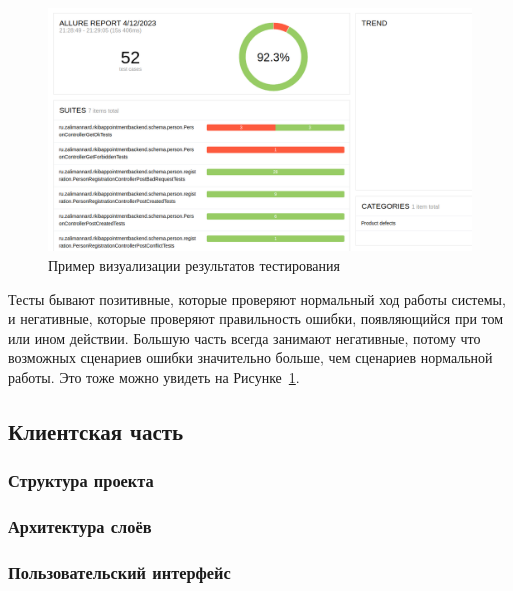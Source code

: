 \documentclass[a4paper,article]{article}
\begin{document}
    \begin{figure}[h]
        
        \centering
        
        \includegraphics[width=0.8\linewidth]{Allure.png}
        
        \caption{\centering Пример визуализации результатов тестирования}
        
        \label{fig:Allure}
        
    \end{figure}
    
    Тесты бывают позитивные, которые проверяют нормальный ход работы системы, и негативные, которые проверяют правильность ошибки, появляющийся при том или ином действии. Большую часть всегда занимают негативные, потому что возможных сценариев ошибки значительно больше, чем сценариев нормальной работы. Это тоже можно увидеть на Рисунке~\ref{fig:Allure}.
    
    \newpage

    \subsection{Клиентская часть}\label{Реализация. Клиентская часть}

    \subsubsection{Структура проекта}\label{Реализация. Клиентская часть. Структура проекта}

    \subsubsection{Архитектура слоёв}\label{Реализация. Клиентская часть. Архитектура слоёв}

    \subsubsection{Пользовательский интерфейс}\label{Реализация. Клиентская часть. Пользовательский интерфейс}
\end{document}
